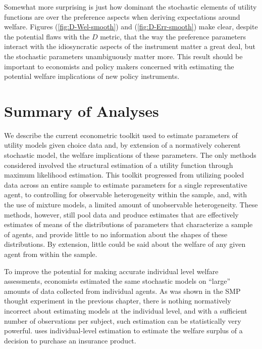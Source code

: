 \documentclass[../main.tex]{subfiles}
\begin{document}
Somewhat more surprising is just how dominant the stochastic elements of utility functions are over the preference aspects when deriving expectations around welfare.
Figures (\ref{fig:D-Wel-smooth}) and (\ref{fig:D-Err-smooth}) make clear, despite the potential flaws with the $D$ metric, that the way the preference parameters interact with the idiosyncratic aspects of the instrument matter a great deal, but the stochastic parameters unambiguously matter more.
This result should be important to economists and policy makers concerned with estimating the potential welfare implications of new policy instruments.

\section{Summary of Analyses}

We describe the current econometric toolkit used to estimate parameters of utility models given choice data and, by extension of a normatively coherent stochastic model, the welfare implications of these parameters.
The only methods considered involved the structural estimation of a utility function through maximum likelihood estimation.
This toolkit progressed from utilizing pooled data across an entire sample to estimate parameters for a single representative agent, to controlling for observable heterogeneity within the sample, and, with the use of mixture models, a limited amount of unobservable heterogeneity.
These methods, however, still pool data and produce estimates that are effectively estimates of means of the distributions of parameters that characterize a sample of agents, and provide little to no information about the shapes of these distributions.
By extension, little could be said about the welfare of any given agent from within the sample.

To improve the potential for making accurate individual level welfare assessments, economists estimated the same stochastic models on \enquote{large} amounts of data collected from individual agents.
As was shown in the SMP thought experiment in the previous chapter, there is nothing normatively incorrect about estimating models at the individual level, and with a sufficient number of observations per subject, such estimation can be statistically very powerful.
\textcite{Harrison2016} uses individual-level estimation to estimate the welfare surplus of a decision to purchase an insurance product.

\end{document}
